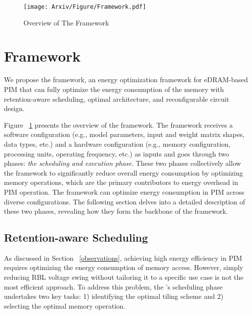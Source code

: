 
\begin{figure}[t]
\centering
\texttt{[image: Arxiv/Figure/Framework.pdf]}
\caption{Overview of The \sysname Framework}
\vspace{-0.1in}
\label{figure4}
\end{figure}


\section{\sysname Framework}
\label{framework}
We propose the \sysname framework, an energy optimization framework for eDRAM-based PIM that can fully optimize the energy consumption of the memory with retention-aware scheduling, optimal architecture, and reconfigurable circuit design.

Figure ~\ref{figure4} presents the overview of the \sysname framework. The framework receives a software configuration (e.g., model parameters, input and weight matrix shapes, data types, etc.) and a hardware configuration (e.g., memory configuration, processing units, operating frequency, etc.) as inputs and goes through two phases: \textit{the scheduling and execution phase}. These two phases collectively allow the \sysname framework to significantly reduce overall energy consumption by optimizing memory operations, which are the primary contributors to energy overhead in PIM operation. The \sysname framework can optimize energy consumption in PIM across diverse configurations. The following section delves into a detailed description of these two phases, revealing how they form the backbone of the \sysname framework.

\subsection{Retention-aware Scheduling}
\label{retention-aware scheduling}
As discussed in Section ~\ref{observations}, achieving high energy efficiency in PIM requires optimizing the energy consumption of memory access. However, simply reducing RBL voltage swing without tailoring it to a specific use case is not the most efficient approach. To address this problem, the \sysname’s scheduling phase undertakes two key tasks: 1) identifying the optimal tiling scheme and 2) selecting the optimal memory operation.

